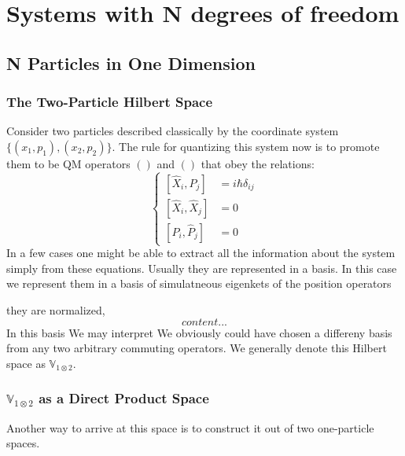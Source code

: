 \chapter{Systems with N degrees of freedom}
\section{N Particles in One Dimension}
\subsection{The Two-Particle Hilbert Space}
Consider two particles described classically by the coordinate system $\{(x_{1},p_{1}),(x_{2},p_{2})\}$. The rule for quantizing this system now is to promote them to be QM operators $()$ and $()$ that obey the relations:
\begin{equation}
\begin{cases}
[\hat{X}_{i}, \hat{P}_{j}] & = i \hbar \delta_{ij}\\
[\hat{X}_{i}, \hat{X}_{j}] & = 0 \\
[\hat{P}_{i}, \hat{P}_{j}] & = 0
\end{cases}
\end{equation}
In a few cases one might be able to extract all the information about the system simply from these equations. Usually they are represented in a basis. In this case we represent them in a basis of simulatneous eigenkets of the position operators

they are normalized,
\begin{equation}
	content...
\end{equation}
In this basis
We may interpret
We obviously could have chosen a differeny basis from any two arbitrary commuting operators. We generally denote this Hilbert space as $\mathbb{V}_{1 \otimes 2}$.
\subsection{$\mathbb{V}_{1 \otimes 2}$ as a Direct Product Space}
Another way to arrive at this space is to construct it out of two one-particle spaces. 
